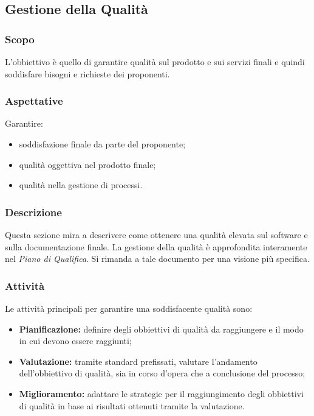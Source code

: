 \subsection{Gestione della Qualità}\label{3.3}

\subsubsection{Scopo}\label{3.3.1}
L'obbiettivo è quello di garantire qualità sul prodotto e sui servizi finali e quindi soddisfare bisogni e richieste dei proponenti.

\subsubsection{Aspettative}
Garantire:
\begin{itemize}
	\item soddisfazione finale da parte del proponente;
	\item qualità oggettiva nel prodotto finale;
	\item qualità nella gestione di processi.
\end{itemize}

\subsubsection{Descrizione}
Questa sezione mira a descrivere come ottenere una qualità elevata sul software e sulla documentazione finale.
La gestione della qualità è approfondita interamente nel \textit{Piano di Qualifica}. Si rimanda a tale documento per una visione più specifica.

\subsubsection{Attività}
Le attività principali per garantire una soddisfacente qualità sono:
\begin{itemize}
	\item \textbf{Pianificazione:} definire degli obbiettivi di qualità da raggiungere e il modo in cui devono essere raggiunti;
	\item \textbf{Valutazione:} tramite standard prefissati, valutare l'andamento dell'obbiettivo di qualità, sia in corso d'opera che a conclusione del processo;
	\item \textbf{Miglioramento:} adattare le strategie per il raggiungimento degli obbiettivi di qualità in base ai risultati ottenuti tramite la valutazione.
\end{itemize}

